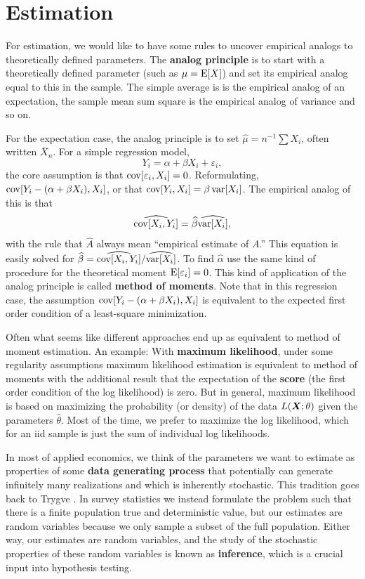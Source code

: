 \documentclass[twoside]{article}
\begin{document}
\section{Estimation}

For estimation, we would like to have some rules to uncover empirical analogs
to theoretically defined parameters. The \textbf{analog principle} is to 
start with a theoretically defined parameter (such as $\mu=\operatorname{E}[X]$) and set its
empirical analog equal to this in the sample. The simple average is is the
empirical analog of an expectation, the sample mean sum square is the empirical
analog of variance and so on. 

For the expectation case, the analog principle is to set $\widehat{\mu} = n^{-1}\sum X_i$,
often written $\overline{X}_n$. For a simple regression model,
\[ Y_i = \alpha + \beta X_i + \varepsilon_i,\] the core assumption is that $\operatorname{cov}[\varepsilon_i,X_i]=0$.
Reformulating, $\operatorname{cov}[Y_i - (\alpha + \beta X_i), X_i]$, or that $\operatorname{cov}[Y_i,X_i] = \beta \operatorname{var}[X_i]$.
The empirical analog of this is that
\[ \widehat{\operatorname{cov}[X_i,Y_i]} = \widehat{\beta} \widehat{\operatorname{var}[X_i]},\]
with the rule that $\widehat{A}$ always mean ``empirical estimate of $A$.'' This equation
is easily solved for $\widehat{\beta} = \widehat{\operatorname{cov}[X_i,Y_i]} / \widehat{\operatorname{var}[X_i]}$. To find
$\widehat{\alpha}$ use the same kind of procedure for the theoretical moment $\operatorname{E}[\varepsilon_i]=0$. This kind
of application of the analog principle is called \textbf{method of moments}. Note
that in this regression case, the assumption $\operatorname{cov}[Y_i - (\alpha + \beta X_i), X_i]$ is equivalent
to the expected first order condition of a least-square minimization.

Often what seems like different approaches end up as equivalent to method of moment estimation.
An example: With \textbf{maximum likelihood}, under some regularity assumptions maximum likelihood 
estimation is equivalent to method of moments with the additional result that the expectation 
of the \textbf{score} (the first order condition of the log likelihood) is zero. But in general,
maximum likelihood is based on maximizing the probability (or density) of the data $L(\bm X;\theta)$ 
given the parameters $\widehat{\theta}$. Most of the time, we prefer to maximize the log likelihood,
which for an iid sample is just the sum of individual log likelihoods.

In most of applied economics, we think of the parameters we want to estimate as properties
of some \textbf{data generating process} that potentially can generate infinitely many realizations and
which is inherently stochastic. This tradition goes back to Trygve \citet{Haavelmo1944}.
In survey statistics we instead formulate the problem such that there is a finite population true and
deterministic value, but our estimates are random variables because we only sample a subset of the
full population. Either way, our estimates are random variables, and the study of the stochastic
properties of these random variables is known as \textbf{inference}, which is a crucial input
into hypothesis testing. 
\end{document}
